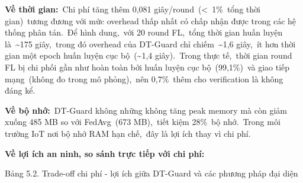 \textbf{Về thời gian:}~Chi phí tăng thêm 0,081 giây/round~(\textless~1\%~tổng thời gian)~tương đương với mức overhead thấp nhất có chấp nhận được trong các hệ thống phân tán.~Để hình dung,~với 20 round FL,~tổng thời gian huấn luyện là~\textasciitilde175 giây,~trong đó overhead của DT-Guard chỉ chiếm~\textasciitilde1,6 giây,~ít hơn thời gian một epoch huấn luyện cục bộ~(\textasciitilde1,4 giây).~Trong thực tế,~thời gian round FL bị chi phối gần như hoàn toàn bởi huấn luyện cục bộ~(99,1\%)~và giao tiếp mạng~(không đo trong mô phỏng),~nên 0,7\%~thêm cho verification là không đáng kể.

\textbf{Về bộ nhớ:}~DT-Guard không những không tăng peak memory mà còn giảm xuống 485 MB so với FedAvg~(673 MB),~tiết kiệm 28\%~bộ nhớ.~Trong môi trường IoT nơi bộ nhớ RAM hạn chế,~đây là lợi ích thay vì chi phí.

\textbf{Về lợi ích an ninh, so sánh trực tiếp với chi phí:}

\protect{}\label{_Toc228034268}{}Bảng 5.2. Trade-off chi phí - lợi ích giữa DT-Guard và các phương pháp đại diện

